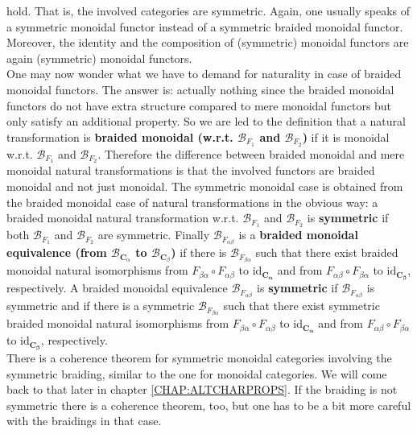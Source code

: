 hold. That is, the involved categories are symmetric. Again, one usually speaks of a symmetric monoidal functor instead of a symmetric braided monoidal functor. Moreover, the identity and the composition of (symmetric) monoidal functors are again (symmetric) monoidal functors.
\\
One may now wonder what we have to demand for naturality in case of braided monoidal functors. The answer is: actually nothing since the braided monoidal functors do not have extra structure compared to mere monoidal functors but only satisfy an additional property. So we are led to the definition that a natural transformation is \textbf{braided monoidal (w.r.t. $\mathcal{B}_{F_{1}}$ and $\mathcal{B}_{F_{2}}$)} if it is monoidal w.r.t. $\mathcal{B}_{F_{1}}$ and $\mathcal{B}_{F_{2}}$. Therefore the difference between braided monoidal and mere monoidal natural transformations is that the involved functors are braided monoidal and not just monoidal. The symmetric monoidal case is obtained from the braided monoidal case of natural transformations in the obvious way: a braided monoidal natural transformation w.r.t. $\mathcal{B}_{F_{1}}$ and $\mathcal{B}_{F_{2}}$ is \textbf{symmetric} if both $\mathcal{B}_{F_{1}}$ and $\mathcal{B}_{F_{2}}$ are symmetric. Finally  $\mathcal{B}_{F_{\alpha\beta}}$ is a \textbf{braided monoidal equivalence (from $\mathcal{B}_{\mathbf{C}_{\alpha}}$ to $\mathcal{B}_{\mathbf{C}_{\beta}}$)} if there is $\mathcal{B}_{F_{\beta\alpha}}$ such that there exist braided monoidal natural isomorphisms from $F_{\beta\alpha} \circ F_{\alpha\beta}$ to $\mathrm{id}_{\mathbf{C_{\alpha}}}$ and from $F_{\alpha\beta} \circ F_{\beta\alpha}$ to $\mathrm{id}_{\mathbf{C_{\beta}}}$, respectively. A braided monoidal equivalence $\mathcal{B}_{F_{\alpha\beta}}$ is \textbf{symmetric} if $\mathcal{B}_{F_{\alpha\beta}}$ is symmetric and if there is a symmetric $\mathcal{B}_{F_{\beta\alpha}}$ such that there exist symmetric braided monoidal natural isomorphisms from $F_{\beta\alpha} \circ F_{\alpha\beta}$ to $\mathrm{id}_{\mathbf{C_{\alpha}}}$ and from $F_{\alpha\beta} \circ F_{\beta\alpha}$ to $\mathrm{id}_{\mathbf{C_{\beta}}}$, respectively.
\\
There is a coherence theorem for symmetric monoidal categories involving the symmetric braiding, similar to the one for monoidal categories. We will come back to that later in chapter \ref{CHAP:ALTCHARPROPS}. If the braiding is not symmetric there is a  coherence theorem, too, but one has to be a bit more careful with the braidings in that case.
\\
